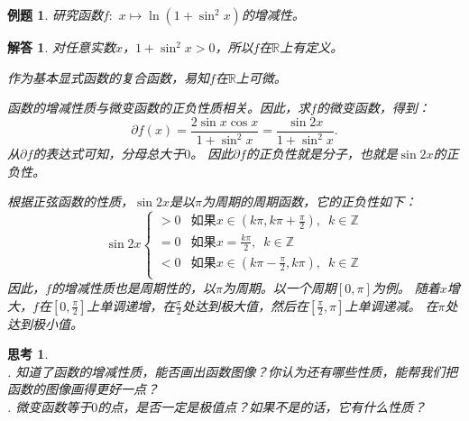 \documentclass[12pt,UTF8]{ctexbook}
\newtheorem{et}{例题}[section]
\newtheorem{sk}{思考}[section]
\newtheorem*{so}{解答}
\begin{document}
\begin{et}
    研究函数$f:\,\,x\mapsto \ln(1 + \sin^2{x})$的增减性。
\end{et}

\begin{so}
    对任意实数$x$，$1 + \sin^2{x} > 0$，所以$f$在$\mathbb{R}$上有定义。

    作为基本显式函数的复合函数，易知$f$在$\mathbb{R}$上可微。

    函数的增减性质与微变函数的正负性质相关。因此，求$f$的微变函数，得到：
    $$ \partial f(x) = \frac{2\sin{x}\cos{x}}{1 + \sin^2{x}} = \frac{\sin{2x}}{1 + \sin^2{x}}.$$
    从$ \partial f $的表达式可知，分母总大于$0$。
    因此$ \partial f $的正负性就是分子，也就是$\sin{2x}$的正负性。

    根据正弦函数的性质，$\sin{2x}$是以$\pi$为周期的周期函数，它的正负性如下：
    $$ \sin{2x} \left\{
        \begin{array}{cl}
            > 0 & \mbox{如果}x \in (k\pi, k\pi + \frac{\pi}{2}),\,\,\, k\in\mathbb{Z} \\
            = 0 & \mbox{如果}x = \frac{k\pi}{2}, \,\,\,k\in\mathbb{Z} \\
            < 0 & \mbox{如果}x \in (k\pi - \frac{\pi}{2}, k\pi), \,\,\,k\in\mathbb{Z} \\
        \end{array}\right.
    $$
    因此，$f$的增减性质也是周期性的，以$\pi$为周期。以一个周期$[0, \pi]$为例。
    随着$x$增大，$f$在$[0, \frac{\pi}{2}]$上单调递增，在$\frac{\pi}{2}$处达到极大值，然后在$[\frac{\pi}{2}, \pi]$上单调递减。
    在$\pi$处达到极小值。
    
\end{so}

\begin{sk}
    \mbox{} \\
    . 知道了函数的增减性质，能否画出函数图像？你认为还有哪些性质，能帮我们把函数的图像画得更好一点？\\
    . 微变函数等于$0$的点，是否一定是极值点？如果不是的话，它有什么性质？    
\end{sk}
\end{document}
